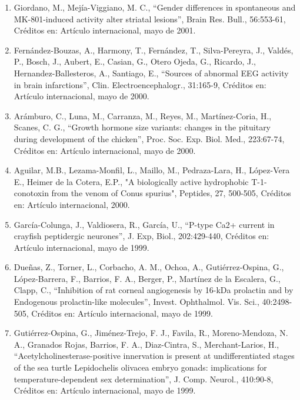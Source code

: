 \documentclass[12pt]{article}
\begin{document}
\begin{enumerate}
\item Giordano, M., Mejía-Viggiano, M. C., “Gender differences in spontaneous and MK-801-induced activity alter striatal lesions”, 
Brain 
Res. Bull., 56:553-61, Créditos en: Artículo internacional, mayo de 2001.

\item Fernández-Bouzas, A., Harmony, T., Fernández, T., Silva-Pereyra, J., Valdés, P., Bosch, J., Aubert, E., Casian, G., Otero Ojeda, 
G., Ricardo, J., Hernandez-Ballesteros, A., Santiago, E., “Sources of abnormal EEG activity in brain infarctions”, Clin. 
Electroencephalogr., 31:165-9, Créditos en: Artículo internacional, mayo de 2000.

\item Arámburo, C., Luna, M., Carranza, M., Reyes, M., Martínez-Coria, H., Scanes, C. G., “Growth hormone size variants: changes in the 
pituitary during development of the chicken”, Proc. Soc. Exp. Biol. Med., 223:67-74, Créditos en: Artículo internacional, mayo de 2000.

\item Aguilar, M.B., Lezama-Monfil, L., Maillo, M., Pedraza-Lara, H., López-Vera E., Heimer de la Cotera, E.P., "A biologically active 
hydrophobic T-1-conotoxin from the venom of Conus spurius", Peptides, 27, 500-505, Créditos en: Artículo internacional, 2000.

\item García-Colunga, J., Valdiosera, R., García, U., “P-type Ca2+ current in crayfish peptidergic neurones”, J. Exp, Biol., 
202:429-440, Créditos en: Artículo internacional, mayo de 1999.

\item Dueñas, Z., Torner, L., Corbacho, A. M., Ochoa, A., Gutiérrez-Ospina, G., López-Barrera, F., Barrios, F. A., Berger, P., Martínez 
de la Escalera, G., Clapp, C., “Inhibition of rat corneal angiogenesis by 16-kDa prolactin and by Endogenous prolactin-like molecules”, 
Invest. Ophthalmol. Vis. Sci., 40:2498-505, Créditos en: Artículo internacional, mayo de 1999.

\item Gutiérrez-Ospina, G., Jiménez-Trejo, F. J., Favila, R., Moreno-Mendoza, N. A., Granados Rojas, Barrios, F. A., Diaz-Cintra, S., 
Merchant-Larios, H., “Acetylcholinesterase-positive innervation is present at undifferentiated stages of the sea turtle Lepidochelis 
olivacea embryo gonads: implications for temperature-dependent sex determination”, J. Comp. Neurol., 410:90-8, Créditos en: Artículo 
internacional, mayo de 1999.


\end{enumerate}
\end{document}
